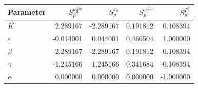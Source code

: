 \begin{tabular}{lrrrr}
\toprule
Parameter & $S_p^{a_{\mathrm{H}}^{\mathrm{dim}}}$ & $S_p^{\tau_{\mathrm{H}}}$ & $S_p^{\omega_0^{\mathrm{dim}}}$ & $S_p^{P^*}$ \\
\midrule
$K$ & 2.289167 & -2.289167 & 0.191812 & 0.108394 \\
$\varepsilon$ & -0.044001 & 0.044001 & 0.466504 & 1.000000 \\
$\beta$ & 2.289167 & -2.289167 & 0.191812 & 0.108394 \\
$\gamma$ & -1.245166 & 1.245166 & 0.341684 & -0.108394 \\
$\alpha$ & 0.000000 & 0.000000 & 0.000000 & -1.000000 \\
\bottomrule
\end{tabular}
